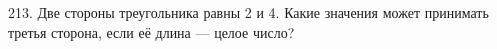 213. Две стороны треугольника равны 2 и 4. Какие значения может принимать третья сторона, если её длина --- целое число?\\
